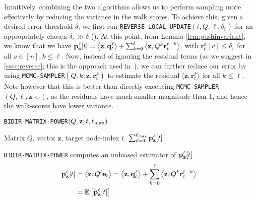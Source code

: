 Intuitively, combining the two algorithms allows us to perform sampling more effectively by reducing the variance in the walk scores.
To achieve this, given a desired error threshold $\delta$, we first run \texttt{REVERSE-LOCAL-UPDATE}$(t,Q,\ell,\delta_r)$ for an appropriately chosen $\delta_r\gg\delta$ (). 
At this point, from Lemma \ref{lem:pushinvariant}, we know that we have
${\mathbf{p}}_\mathbf{z}^{\ell}[t] = \left< \mathbf{z}, \mathbf{q}_t^{\ell} \right> + \sum_{k=0}^{\ell} \left<\mathbf{z}, Q^k\mathbf{r}_t^{\ell-k}\right>$, with $\mathbf{r}_t^{k}[v]\leq\delta_r$ for all $v\in[n],k\leq\ell$.
Now, instead of ignoring the residual terms (as we suggest in \ref{ssec:reverse}; this is the approach used in~\cite{andersen2007local,lee2014asynchronous}), we can further reduce our error by using \texttt{MCMC-SAMPLER}$(Q,k,\mathbf{z},\mathbf{r}_t^k)$ to estimate the residual $\langle\mathbf{z},\mathbf{r}_t^k\rangle$ for all $k\leq\ell$.
Note however that this is better than directly executing \texttt{MCMC-SAMPLER}$(Q,\ell,\mathbf{z},e_{t})$, as the residuals have much smaller magnitude than $1$, and hence the walk-scores have lower variance.
\begin{algorithm}[ht]
\caption{\texttt{BIDIR-MATRIX-POWER}$(Q, \mathbf{z}, t,\ell_{\max})$}
\label{alg:linearsysest}
\begin{algorithmic}[1]
\REQUIRE Matrix $Q$, vector $\mathbf{z}$, target node-index $t$.
\ENDFOR
{}
\ENDFOR
\RETURN $\sum_{\ell=0}^{\ell_{\max}} {\mathbf{p}}_\mathbf{z}^{\ell}[t]$ 
\end{algorithmic}
\end{algorithm} 

\begin{lemma}
\texttt{BIDIR-MATRIX-POWER} computes an unbiased estimator of ${\mathbf{p}}_\mathbf{z}^{\ell}[t]$
\begin{align*}
{\mathbf{p}}_\mathbf{z}^{\ell}[t] &=  \left<\mathbf{z}, Q^l \mathbf{e}_t \right>= \left<\mathbf{z}, \mathbf{q}_t^{\ell} \right> + \sum_{k=0}^{\ell} \left<\mathbf{z} , Q^k\mathbf{r}_t^{\ell-k}\right>\\
&= \mathbb{E}\left[\hat{\mathbf{p}}_\mathbf{z}^{\ell}[t] \right]
\end{align*}
\end{lemma}

